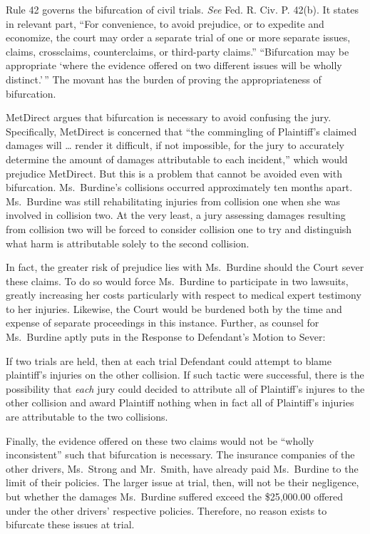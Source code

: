 \documentclass[11pt,letterpaper,twoside]{article}
\renewenvironment{quote}{%
   \list{}{%
     \leftmargin2em   %
     \rightmargin\leftmargin\parsep .1em }
   \item\relax
}
{\endlist}
\begin{document}
Rule 42 governs the bifurcation of civil trials. \emph{See} Fed. R. Civ.
P. 42(b). It states in relevant part, ``For convenience, to avoid
prejudice, or to expedite and economize, the court may order a separate
trial of one or more separate issues, claims, crossclaims,
counterclaims, or third-party claims.'' ``Bifurcation may be appropriate
`where the evidence offered on two different issues will be wholly
distinct.'\,'' The movant has the burden of proving the appropriateness
of bifurcation.

MetDirect argues that bifurcation is necessary to avoid confusing the
jury. Specifically, MetDirect is concerned that ``the commingling of
Plaintiff's claimed damages will \ldots{} render it difficult, if not
impossible, for the jury to accurately determine the amount of damages
attributable to each incident,'' which would prejudice MetDirect. But
this is a problem that cannot be avoided even with bifurcation.
Ms.~Burdine's collisions occurred approximately ten months apart.
Ms.~Burdine was still rehabilitating injuries from collision one when
she was involved in collision two. At the very least, a jury assessing
damages resulting from collision two will be forced to consider
collision one to try and distinguish what harm is attributable solely to
the second collision.

In fact, the greater risk of prejudice lies with Ms.~Burdine should the
Court sever these claims. To do so would force Ms.~Burdine to
participate in two lawsuits, greatly increasing her costs particularly
with respect to medical expert testimony to her injuries. Likewise, the
Court would be burdened both by the time and expense of separate
proceedings in this instance. Further, as counsel for Ms.~Burdine aptly
puts in the Response to Defendant's Motion to Sever:

\begin{quote}
If two trials are held, then at each trial Defendant could attempt to
blame plaintiff's injuries on the other collision. If such tactic were
successful, there is the possibility that \emph{each} jury could decided
to attribute all of Plaintiff's injures to the other collision and award
Plaintiff nothing when in fact all of Plaintiff's injuries are
attributable to the two collisions.
\end{quote}

Finally, the evidence offered on these two claims would not be ``wholly
inconsistent'' such that bifurcation is necessary. The insurance
companies of the other drivers, Ms.~Strong and Mr.~Smith, have already
paid Ms.~Burdine to the limit of their policies. The larger issue at
trial, then, will not be their negligence, but whether the damages
Ms.~Burdine suffered exceed the \$25,000.00 offered under the other
drivers' respective policies. Therefore, no reason exists to bifurcate
these issues at trial.
\end{document}
